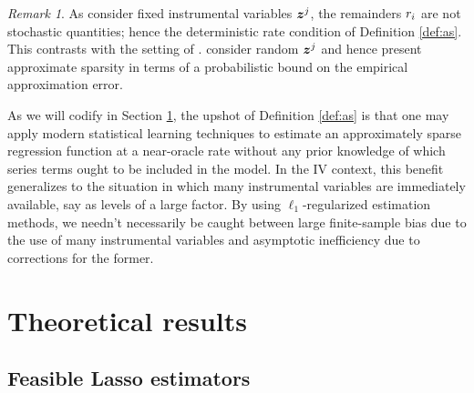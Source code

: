 \documentclass{uwstat572}
\theoremstyle{definition}
\theoremstyle{remark}
\newtheorem{rek}[thm]{Remark}
\newcommand{\bs}[1]{\boldsymbol{#1}}
\numberwithin{equation}{section}
\begin{document}
\begin{rek} As \cite{BCH11} consider fixed instrumental variables $\z^j$, the remainders $r_i$ are not stochastic quantities; hence the deterministic rate condition of Definition \ref{def:as}. This contrasts with the setting of \cite{N97}. \cite{BCCH12} consider random $\z^j$ and hence present approximate sparsity in terms of a probabilistic bound on the empirical approximation error. 
\end{rek}

As we will codify in Section \ref{s:theory}, the upshot of Definition \ref{def:as} is that one may apply modern statistical learning techniques to estimate an approximately sparse regression function at a near-oracle rate without any prior knowledge of which series terms ought to be included in the model. In the IV context, this benefit generalizes to the situation in which many instrumental variables are immediately available, say as levels of a large factor. By using $\ell_1$-regularized estimation methods, we needn't necessarily be caught between large finite-sample bias due to the use of many instrumental variables and asymptotic inefficiency due to corrections for the former.  




%
\section{Theoretical results}\label{s:theory}

%
\subsection{Feasible Lasso estimators}\label{ss:feasible}
\newcommand{\minse}{\phi_{\mathrm{min}}}
\newcommand{\maxse}{\phi_{\mathrm{max}}}
\newcommand{\cminse}{\kappa_*}
\newcommand{\cmaxse}{\kappa^*}
\newcommand{\M}{\bs{M}}
\newcommand{\gd}{\delta}
\newcommand{\diff}{\bs{\gd}}
\end{document}
